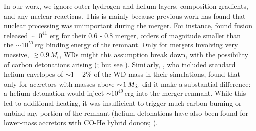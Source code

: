 

In our work, we ignore outer hydrogen and helium layers, composition gradients, and any nuclear reactions.  This is mainly because previous work has found that nuclear processing was unimportant during the merger.  For instance,  found fusion released $\sim\!10^{41}$ erg for their 0.6 - 0.8 {\Msun} merger, orders of magnitude smaller than the $\sim\!10^{50}\,$erg binding energy of the remnant.  Only for mergers involving very massive, $\gtrsim\!0.9\,M_\odot$ WDs might this assumption break down, with the possibility of carbon detonations arising (\citealt{pakm+10,pakm+11,pakm+12}; but see \citealt{rask+12,dan+12}).  Similarly, \cite{rask+12}, who included standard helium envelopes of $\sim\!1-2$\% of the WD mass in their simulations, found that only for accretors with masses above $\sim\!1\,\Msun$ did it make a substantial difference: a helium detonation would inject $\sim\!10^{49}\,$erg into the merger remnant.  While this led to additional heating, it was insufficient to trigger much carbon burning or unbind any portion of the remnant (helium detonations have also been found for lower-mass accretors with CO-He hybrid donors; \citealt{dan+12}).


